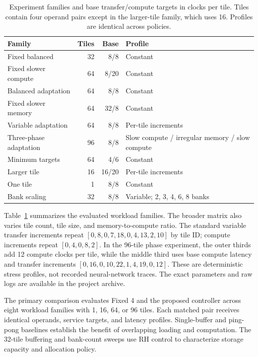 \documentclass[twocolumn,10pt]{article}
\begin{document}
\begin{table}[t]
\centering\caption{Experiment families and base transfer/compute targets
in clocks per tile. Tiles contain four operand pairs except in the
larger-tile family, which uses 16. Profiles are identical across policies.}
\label{tab:matrix}\scriptsize
\setlength{\tabcolsep}{3pt}
\begin{tabular}{p{}rrp{}}
\toprule
Family & Tiles & Base & Profile\\
\midrule
Fixed balanced & 32 & 8/8 & Constant\\
Fixed slower compute & 64 & 8/20 & Constant\\
Balanced adaptation & 64 & 8/8 & Constant\\
Fixed slower memory & 64 & 32/8 & Constant\\
Variable adaptation & 64 & 8/8 & Per-tile increments\\
Three-phase adaptation & 96 & 8/8 & Slow compute / irregular memory / slow compute\\
Minimum targets & 64 & 4/6 & Constant\\
Larger tile & 16 & 16/20 & Per-tile increments\\
One tile & 1 & 8/8 & Constant\\
Bank scaling & 32 & 8/8 & Variable; 2, 3, 4, 6, 8 banks\\
\bottomrule
\end{tabular}
\end{table}

Table~\ref{tab:matrix} summarizes the evaluated workload families. The broader
matrix also varies tile count, tile size, and memory-to-compute ratio.
The standard variable transfer increments repeat
$[0,8,0,7,18,0,4,13,2,10]$ by tile ID; compute increments repeat
$[0,4,0,8,2]$. In the 96-tile phase experiment, the outer thirds add
12 compute clocks per tile, while the middle third uses base compute
latency and transfer increments
$[0,16,0,10,22,1,4,19,0,12]$. These are deterministic stress profiles,
not recorded neural-network traces. The exact parameters and raw logs are
available in the project archive.

The primary comparison evaluates Fixed 4 and the proposed controller
across eight workload families with 1, 16, 64, or 96 tiles. Each matched
pair receives identical operands, service targets, and latency profiles.
Single-buffer and ping-pong baselines establish the benefit of overlapping
loading and computation. The 32-tile buffering and bank-count sweeps use
RH control to characterize storage capacity and allocation policy.
\end{document}
